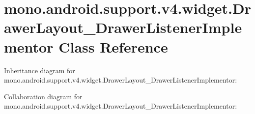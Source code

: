 \hypertarget{classmono_1_1android_1_1support_1_1v4_1_1widget_1_1_drawer_layout___drawer_listener_implementor}{}\section{mono.\+android.\+support.\+v4.\+widget.\+Drawer\+Layout\+\_\+\+Drawer\+Listener\+Implementor Class Reference}
\label{classmono_1_1android_1_1support_1_1v4_1_1widget_1_1_drawer_layout___drawer_listener_implementor}


Inheritance diagram for mono.\+android.\+support.\+v4.\+widget.\+Drawer\+Layout\+\_\+\+Drawer\+Listener\+Implementor\+:


Collaboration diagram for mono.\+android.\+support.\+v4.\+widget.\+Drawer\+Layout\+\_\+\+Drawer\+Listener\+Implementor\+:
